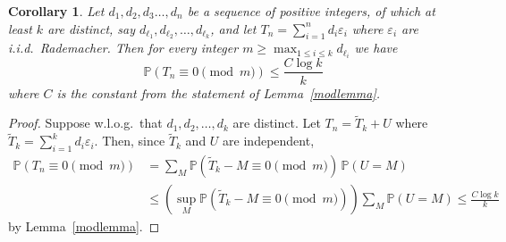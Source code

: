 \documentclass[12pt]{article}
\newtheorem{corollary}{Corollary}
\newcommand\eps{\varepsilon}
\renewcommand\P{\mathbb{P}}
\begin{document}
\begin{corollary}\label{modcor}
Let $d_1,d_2,d_3\dots,d_n$ be a sequence of positive integers, of which at least $k$ are distinct, say $d_{\ell_1},d_{\ell_2},\dots,d_{\ell_k}$, and let $T_n=\sum_{i=1}^n d_i\eps_i$ where  $\eps_i$ are i.i.d.\ Rademacher. Then for every integer $\displaystyle  m\ge \max_{1\le i\le k}d_{\ell_i}$ we have
$$
\P(T_n\equiv 0\pmod m)\le \frac{C \log k}{k}    
$$
where $C$ is the constant from the statement of Lemma~\ref{modlemma}.
\end{corollary}
\begin{proof}
Suppose w.l.o.g.\ that $d_1,d_2,\dots,d_k$ are distinct. Let $T_n=\tilde T_k+U$ where $\tilde T_k=\sum_{i=1}^k d_i\eps_i$. Then, since $\tilde T_k$ and $U$ are independent,
\begin{align*}
\P(T_n\equiv 0\pmod m)&=\sum_M  \P(\tilde T_k-M\equiv 0\pmod m)\,\P(U=M)
\\ &\le \left(\sup_M \P(\tilde T_k-M\equiv 0\pmod m) \right) \sum_M \P(U=M)
\le \frac{C \log k}{k} 
\end{align*}
by Lemma~\ref{modlemma}.
\end{proof}

\end{document}
